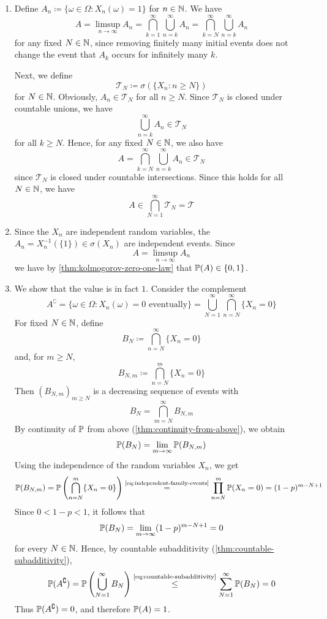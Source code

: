 \pagebreak[3]
\begin{solution}
\leavevmode
\begin{enumerate}[label=(\alph*)]
\item
Define $A_n \coloneq \{\omega \in \Omega : X_n(\omega) = 1\}$ for $n \in \mathbb{N}$.
We have
\[
A = \limsup_{n \to \infty} A_n
=
\bigcap_{k=1}^{\infty} \bigcup_{n = k}^{\infty} A_n 
=
\bigcap_{k=N}^{\infty} \bigcup_{n = k}^{\infty} A_n 
\]
for any fixed $N \in \mathbb{N}$, since removing finitely many initial events 
does not change the event that \(A_k\) occurs for infinitely many \(k\).

Next, we define 
\[\mathcal{T}_N \coloneq \sigma(\{X_n : n \ge N\})\] 
for $N \in \mathbb{N}$.
Obviously, $A_n \in \mathcal{T}_N$ for all $n \ge N$.
Since $\mathcal{T}_N$ is closed under countable unions, we have 
\[\bigcup_{n = k}^{\infty} A_n \in \mathcal{T}_N\]
 for all $k \ge N$.
Hence, for any fixed $N \in \mathbb{N}$, we also have 
\[A = \bigcap_{k=N}^{\infty} \bigcup_{n = k}^{\infty} A_n \in \mathcal{T}_N\] 
since $\mathcal{T}_N$ is closed under countable intersections.
Since this holds for all $N \in \mathbb{N}$, we have 
\[
A \in \bigcap_{N=1}^{\infty} \mathcal{T}_N = \mathcal{T}
\]
\item
Since the $X_n$ are independent random variables, the $A_n = X_n^{-1}(\{1\}) \in \sigma(X_n)$ are independent events.
Since
\[
A = \limsup_{n \to \infty} A_n
\]
we have by \autoref{thm:kolmogorov-zero-one-law} that $\mathbb{P}(A) \in \{0,1\}$.

\item
We show that the value is in fact $1$.
Consider the complement
\[
A^{\complement}
=
\{\omega \in \Omega : \text{$X_n(\omega)=0$ eventually}\}
=
\bigcup_{N=1}^{\infty} \bigcap_{n=N}^{\infty} \{X_n = 0\}
\]
For fixed $N \in \mathbb{N}$, define
\[
B_N
\coloneq
\bigcap_{n=N}^{\infty} \{X_n = 0\}
\]
and, for $m \ge N$,
\[
B_{N,m}
\coloneq
\bigcap_{n=N}^{m} \{X_n = 0\}
\]
Then $(B_{N,m})_{m \ge N}$ is a decreasing sequence of events with
\[
B_N
=
\bigcap_{m=N}^{\infty} B_{N,m}
\]
By continuity of $\mathbb{P}$ from above (\autoref{thm:continuity-from-above}), we obtain
\[
\mathbb{P}(B_N)
=
\lim_{m \to \infty} \mathbb{P}(B_{N,m})
\]
Using the independence of the random variables $X_n$, we get
\[
\mathbb{P}(B_{N,m})
=
\mathbb{P}\left(\bigcap_{n=N}^{m} \{X_n = 0\}\right)
\overset{\text{\eqref{eq:independent-family-events}}}{=}
\prod_{n=N}^{m} \mathbb{P}(X_n = 0)
=
(1-p)^{m-N+1}
\]
Since $0 < 1-p < 1$, it follows that
\[
\mathbb{P}(B_N)
=
\lim_{m \to \infty}(1-p)^{m-N+1}
=
0
\]
for every $N \in \mathbb{N}$.
Hence, by countable subadditivity (\autoref{thm:countable-subadditivity}),
\[
\mathbb{P}(A^{\complement})
=
\mathbb{P}\left(\bigcup_{N=1}^{\infty} B_N\right)
\overset{\text{\eqref{eq:countable-subadditivity}}}{\leq}
\sum_{N=1}^{\infty} \mathbb{P}(B_N)
=
0
\]
Thus $\mathbb{P}(A^{\complement}) = 0$, and therefore $\mathbb{P}(A)=1$.


\end{enumerate}
\end{solution}
